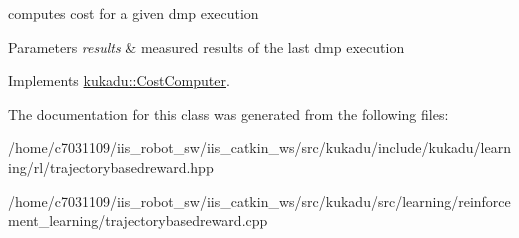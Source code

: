 computes cost for a given dmp execution 


\begin{DoxyParams}{Parameters}
{\em results} & measured results of the last dmp execution \\
\hline
\end{DoxyParams}


Implements \hyperlink{classkukadu_1_1CostComputer_a8d02974e1f097ac0451f03f535843175}{kukadu\-::\-Cost\-Computer}.



The documentation for this class was generated from the following files\-:\begin{DoxyCompactItemize}
\item 
/home/c7031109/iis\-\_\-robot\-\_\-sw/iis\-\_\-catkin\-\_\-ws/src/kukadu/include/kukadu/learning/rl/trajectorybasedreward.\-hpp\item 
/home/c7031109/iis\-\_\-robot\-\_\-sw/iis\-\_\-catkin\-\_\-ws/src/kukadu/src/learning/reinforcement\-\_\-learning/trajectorybasedreward.\-cpp\end{DoxyCompactItemize}
